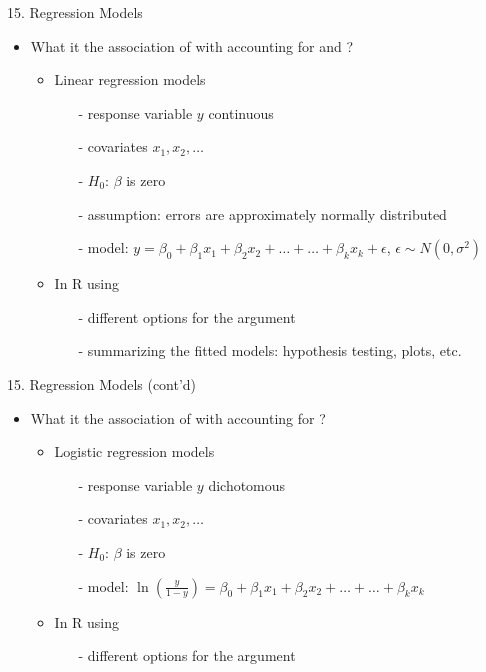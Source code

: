 \documentclass[14pt, aspectratio=169, sectionpage=simple, xclolor=table]{beamer}
\begin{document}
\begin{frame}[fragile]{15. Regression Models}
\begin{itemize}
\item What it the association of  with  accounting for  and ?
\begin{itemize}
\item Linear regression models
\begin{itemize}
\item[-] response variable $y$ continuous
\item[-] covariates $x_1, x_2, \dots$
\item[-] $H_0$: $\beta$ is zero
\item[-] assumption: errors are approximately normally distributed
\item[-] model: $y = \beta_0 + \beta_1x_1 + \beta_2x_2 + \dots + \dots + \beta_kx_k + \epsilon$, $\epsilon \sim N(0,\sigma^2)$
\vspace{1ex}
\end{itemize}
\item In R using 
\begin{itemize}
\item[-] different options for the  argument
\item[-] summarizing the fitted models: hypothesis testing, plots, etc.
\nl
\end{itemize}
\end{itemize}
\end{itemize}
\end{frame}
\begin{frame}[fragile]{15. Regression Models (cont'd)}
\begin{itemize}
\item What it the association of  with  accounting for ?
\begin{itemize}
\item Logistic regression models
\begin{itemize}
\item[-] response variable $y$ dichotomous
\item[-] covariates $x_1, x_2, \dots$
\item[-] $H_0$: $\beta$ is zero
\item[-] model: $\ln(\frac{y}{1-y}) = \beta_0 + \beta_1x_1 + \beta_2x_2 + \dots + \dots + \beta_kx_k$
\vspace{1ex}
\end{itemize}
\item In R using 
\begin{itemize}
\item[-] different options for the  argument
\end{itemize}
\end{itemize}
\end{itemize}
\end{frame}
\end{document}
